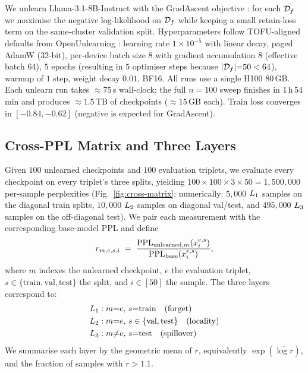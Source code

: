 We unlearn Llama-3.1-8B-Instruct \citep{dubey2024llama3} with the GradAscent objective \citep{jang2023knowledge}: for each $\mathcal{D}_f$ we maximise the negative log-likelihood on $\mathcal{D}_f$ while keeping a small retain-loss term on the same-cluster validation split. Hyperparameters follow TOFU-aligned defaults from OpenUnlearning \citep{maini2024tofu, dorna2025openunlearning}: learning rate $1\!\times\!10^{-5}$ with linear decay, paged AdamW (32-bit), per-device batch size $8$ with gradient accumulation $8$ (effective batch $64$), $5$ epochs (resulting in $5$ optimiser steps because $|\mathcal{D}_f|{=}50<64$), warmup of $1$ step, weight decay $0.01$, BF16. All runs use a single H100 80\,GB. Each unlearn run takes $\approx 75$\,s wall-clock; the full $n{=}100$ sweep finishes in $1$\,h\,$54$\,min and produces $\approx 1.5$\,TB of checkpoints ($\approx 15$\,GB each). Train loss converges in $[-0.84, -0.62]$ (negative is expected for GradAscent).

\subsection{Cross-PPL Matrix and Three Layers}
\label{sec:matrix}

Given $100$ unlearned checkpoints and $100$ evaluation triplets, we evaluate every checkpoint on every triplet's three splits, yielding $100\times100\times3\times50 = 1{,}500{,}000$ per-sample perplexities (Fig.~\ref{fig:cross-matrix}; numerically: $5{,}000$ $L_1$ samples on the diagonal train splits, $10{,}000$ $L_2$ samples on diagonal val/test, and $495{,}000$ $L_3$ samples on the off-diagonal test). We pair each measurement with the corresponding base-model PPL and define
\begin{equation}
    r_{m,e,s,i} \;=\; \frac{\mathrm{PPL}_{\text{unlearned},m}(x_i^{e,s})}{\mathrm{PPL}_{\text{base}}(x_i^{e,s})},
\end{equation}
where $m$ indexes the unlearned checkpoint, $e$ the evaluation triplet, $s\in\{\text{train},\text{val},\text{test}\}$ the split, and $i\in[50]$ the sample. The three layers correspond to:
\begin{align*}
    L_1&: m{=}e,\, s{=}\text{train} \quad\text{(forget)}\\
    L_2&: m{=}e,\, s\in\{\text{val},\text{test}\} \quad\text{(locality)}\\
    L_3&: m{\neq}e,\, s{=}\text{test} \quad\text{(spillover)}
\end{align*}
We summarise each layer by the geometric mean of $r$, equivalently $\exp(\overline{\log r})$, and the fraction of samples with $r{>}1.1$.

